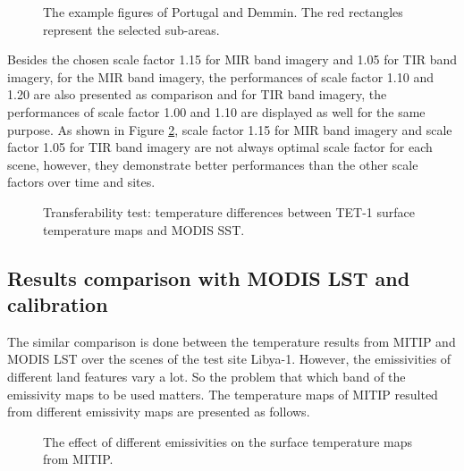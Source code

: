 \begin{figure}[!htbp]
\centering
{}
\vspace{0.5in}
\caption{The example figures of Portugal and Demmin. The red rectangles represent the selected sub-areas.}
\label{fig:portugal&demmin}
\end{figure}

\noindent Besides the chosen scale factor 1.15 for MIR band imagery and 1.05 for TIR band imagery, for the MIR band imagery, the performances of scale factor 1.10 and 1.20 are also presented as comparison and for TIR band imagery, the performances of scale factor 1.00 and 1.10 are displayed as well for the same purpose. As shown in Figure \ref{fig:SST_test}, scale factor 1.15 for MIR band imagery and scale factor 1.05 for TIR band imagery are not always optimal scale factor for each scene, however, they demonstrate better performances than the other scale factors over time and sites.\\

\begin{figure}[!htbp]
\centering
{}
\hspace{0.5in}
\caption{Transferability test: temperature differences between TET-1 surface temperature maps and MODIS SST.}
\label{fig:SST_test}
\end{figure}


\subsection{Results comparison with MODIS LST and calibration}
The similar comparison is done between the temperature results from MITIP and MODIS LST over the scenes of the test site Libya-1. However, the emissivities of different land features vary a lot. So the problem that which band of the emissivity maps to be used matters. The temperature maps of MITIP resulted from different emissivity maps are presented as follows.\\

\begin{figure}[!htbp]
\centering
{}
\hspace{0.5in}
\caption{The effect of different emissivities on the surface temperature maps from MITIP.}
\label{fig:diff_emi_Lybia}
\end{figure}

